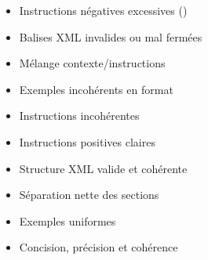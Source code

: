 \vspace{-0.5cm}\begin{Remarque}
    \vspace{-0.5cm}\begin{Colonnes}[2]%
        \begin{tcolorbox}[title={\textcolor{red!75!white}{\textcolor{red}{\faTimes} À éviter}}, colback=red!5]
            \begin{itemize}[label=$\times$]
                \item Instructions négatives excessives ()
                \item Balises XML invalides ou mal fermées
                \item Mélange contexte/instructions
                \item Exemples incohérents en format
                \item Instructions incohérentes
            \end{itemize}
        \end{tcolorbox}
        \begin{tcolorbox}[title={\textcolor{green!70!black}{$\checkmark$ Bonnes pratiques}}, colback=green!5]
            \begin{itemize}[label=$\checkmark$]
                \item Instructions positives claires
                \item Structure XML valide et cohérente
                \item Séparation nette des sections
                \item Exemples uniformes
                \item Concision, précision et cohérence
            \end{itemize}
        \end{tcolorbox}
    \end{Colonnes}
\end{Remarque}
